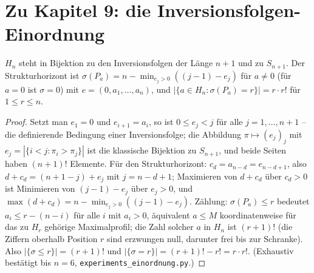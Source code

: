 \section*{Zu Kapitel 9: die Inversionsfolgen-Einordnung}

\begin{satz}[Register S44]
$H_n$ steht in Bijektion zu den Inversionsfolgen der Länge $n{+}1$
und zu $S_{n+1}$. Der Strukturhorizont ist
$\sigma(P_a)=n-\min_{e_j>0}((j{-}1)-e_j)$ für $a\ne0$ (für $a=0$
ist $\sigma=0$) mit $e=(0,a_1,\ldots,a_n)$, und
$|\{a\in H_n:\sigma(P_a)=r\}|=r\cdot r!$ für $1\le r\le n$.
\end{satz}

\begin{proof}
Setzt man $e_1=0$ und $e_{i+1}=a_i$, so ist $0\le e_j<j$ für alle
$j=1,\ldots,n{+}1$ -- die definierende Bedingung einer
Inversionsfolge; die Abbildung $\pi\mapsto(e_j)_j$ mit
$e_j=|\{i<j:\pi_i>\pi_j\}|$ ist die klassische Bijektion zu
$S_{n+1}$, und beide Seiten haben $(n{+}1)!$ Elemente. Für den
Strukturhorizont: $c_d=a_{n-d}=e_{n-d+1}$, also
$d+c_d=(n{+}1-j)+e_j$ mit $j=n-d+1$; Maximieren von $d+c_d$ über
$c_d>0$ ist Minimieren von $(j{-}1)-e_j$ über $e_j>0$, und
$\max(d+c_d)=n-\min_{e_j>0}((j{-}1)-e_j)$. Zählung: $\sigma(P_a)\le r$
bedeutet $a_i\le r-(n-i)$ für alle $i$ mit $a_i>0$, äquivalent
$a\le M$ koordinatenweise für das zu $H_r$ gehörige Maximalprofil;
die Zahl solcher $a$ in $H_n$ ist $(r{+}1)!$ (die Ziffern oberhalb
Position $r$ sind erzwungen null, darunter frei bis zur Schranke).
Also $|\{\sigma\le r\}|=(r{+}1)!$ und
$|\{\sigma=r\}|=(r{+}1)!-r!=r\cdot r!$. (Exhaustiv bestätigt bis
$n=6$, \texttt{experiments\_einordnung.py}.)
\end{proof}
